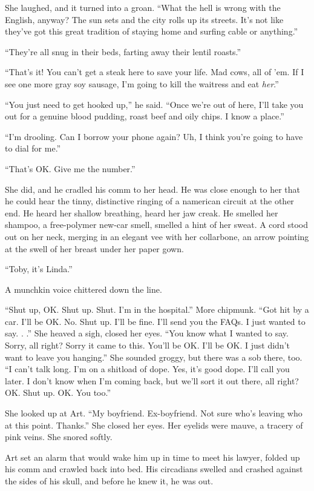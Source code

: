 She laughed, and it turned into a groan. “What the hell is wrong
with the English, anyway? The sun sets and the city rolls up its
streets. It’s not like they’ve got this great tradition of staying
home and surfing cable or anything.”

“They’re all snug in their beds, farting away their lentil
roasts.”

“That’s it! You can’t get a steak here to save your life. Mad cows,
all of ’em. If I see one more gray soy sausage, I’m going to kill
the waitress and eat \emph{her}.”

“You just need to get hooked up,” he said. “Once we’re out of here,
I’ll take you out for a genuine blood pudding, roast beef and oily
chips. I know a place.”

“I’m drooling. Can I borrow your phone again? Uh, I think you’re
going to have to dial for me.”

“That’s OK. Give me the number.”

She did, and he cradled his comm to her head. He was close enough
to her that he could hear the tinny, distinctive ringing of a
namerican circuit at the other end. He heard her shallow breathing,
heard her jaw creak. He smelled her shampoo, a free-polymer new-car
smell, smelled a hint of her sweat. A cord stood out on her neck,
merging in an elegant vee with her collarbone, an arrow pointing at
the swell of her breast under her paper gown.

“Toby, it’s Linda.”

A munchkin voice chittered down the line.

“Shut up, OK. Shut up. Shut. I’m in the hospital.” More chipmunk.
“Got hit by a car. I’ll be OK. No. Shut up. I’ll be fine. I’ll send
you the FAQs. I just wanted to say. . .” She heaved a sigh, closed
her eyes. “You know what I wanted to say. Sorry, all right? Sorry
it came to this. You’ll be OK. I’ll be OK. I just didn’t want to
leave you hanging.” She sounded groggy, but there was a sob there,
too. “I can’t talk long. I’m on a shitload of dope. Yes, it’s good
dope. I’ll call you later. I don’t know when I’m coming back, but
we’ll sort it out there, all right? OK. Shut up. OK. You too.”

She looked up at Art. “My boyfriend. Ex-boyfriend. Not sure who’s
leaving who at this point. Thanks.” She closed her eyes. Her
eyelids were mauve, a tracery of pink veins. She snored softly.

Art set an alarm that would wake him up in time to meet his lawyer,
folded up his comm and crawled back into bed. His circadians
swelled and crashed against the sides of his skull, and before he
knew it, he was out.

